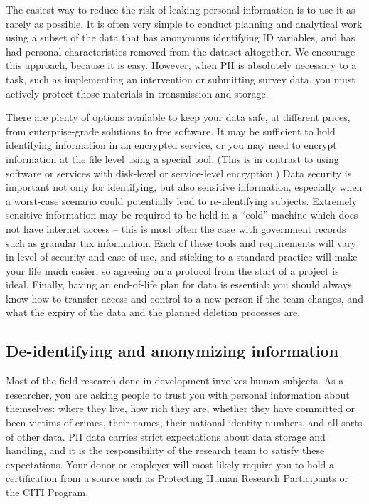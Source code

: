 The easiest way to reduce the risk of leaking personal information is to use it as rarely as possible.
It is often very simple to conduct planning and analytical work
using a subset of the data that has anonymous identifying ID variables,
and has had personal characteristics removed from the dataset altogether.
We encourage this approach, because it is easy.
However, when PII is absolutely necessary to a task,
such as implementing an intervention
or submitting survey data,
you must actively protect those materials in transmission and storage.

There are plenty of options available to keep your data safe,
at different prices, from enterprise-grade solutions to free software.
It may be sufficient to hold identifying information in an encrypted service,
or you may need to encrypt information at the file level using a special tool.
(This is in contrast to using software or services with disk-level or service-level encryption.)
Data security is important not only for identifying, but also sensitive information,
especially when a worst-case scenario could potentially lead to re-identifying subjects.
Extremely sensitive information may be required to be held in a ``cold'' machine
which does not have internet access -- this is most often the case with
government records such as granular tax information.
Each of these tools and requirements will vary in level of security and ease of use,
and sticking to a standard practice will make your life much easier,
so agreeing on a protocol from the start of a project is ideal.
Finally, having an end-of-life plan for data is essential:
you should always know how to transfer access and control to a new person if the team changes,
and what the expiry of the data and the planned deletion processes are.

\subsection{De-identifying and anonymizing information}

Most of the field research done in development involves human subjects.
As a researcher, you are asking people to trust you with personal information about themselves:
where they live, how rich they are, whether they have committed or been victims of crimes,
their names, their national identity numbers, and all sorts of other data.
PII data carries strict expectations about data storage and handling,
and it is the responsibility of the research team to satisfy these expectations.
Your donor or employer will most likely require you to hold a certification from a source
such as Protecting Human Research Participants
or the CITI Program.

